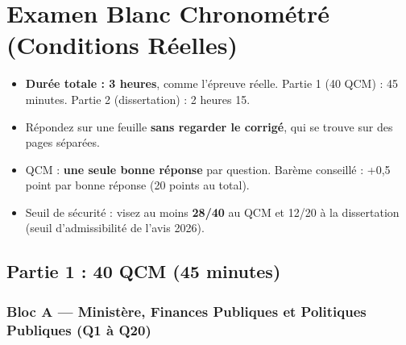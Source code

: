 \chapter{Examen Blanc Chronométré (Conditions Réelles)}

\begin{tcolorbox}[colback=red!4!white,colframe=red!60!black,title=\textbf{Consignes de l'examen blanc}]
\begin{itemize}
    \item \textbf{Durée totale : 3 heures}, comme l'épreuve réelle. Partie 1 (40 QCM) : 45 minutes. Partie 2 (dissertation) : 2 heures 15.
    \item Répondez sur une feuille \textbf{sans regarder le corrigé}, qui se trouve sur des pages séparées.
    \item QCM : \textbf{une seule bonne réponse} par question. Barème conseillé : +0,5 point par bonne réponse (20 points au total).
    \item Seuil de sécurité : visez au moins \textbf{28/40} au QCM et 12/20 à la dissertation (seuil d'admissibilité de l'avis 2026).
\end{itemize}
\end{tcolorbox}

\section{Partie 1 : 40 QCM (45 minutes)}

\subsection*{Bloc A --- Ministère, Finances Publiques et Politiques Publiques (Q1 à Q20)}

